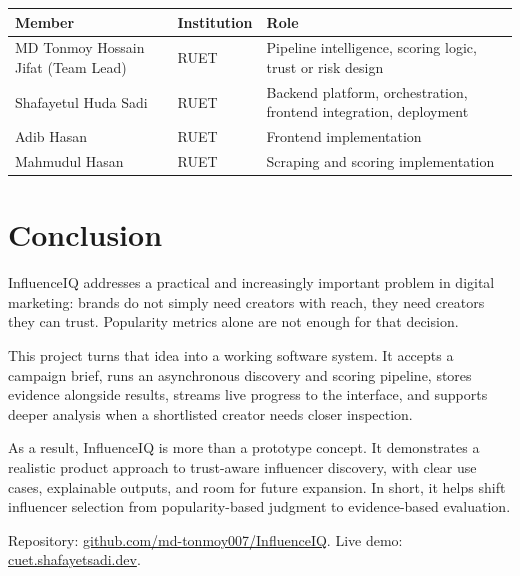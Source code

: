 \documentclass[11pt,a4paper]{article}
\begin{document}
\begin{center}
\begin{tabular}{p{} p{} p{}}
\toprule
\textbf{Member} & \textbf{Institution} & \textbf{Role} \\
\midrule
MD Tonmoy Hossain Jifat (Team Lead) & RUET & Pipeline intelligence, scoring logic, trust or risk design \\
Shafayetul Huda Sadi & RUET & Backend platform, orchestration, frontend integration, deployment \\
Adib Hasan & RUET & Frontend implementation \\
Mahmudul Hasan & RUET & Scraping and scoring implementation \\
\bottomrule
\end{tabular}
\end{center}

\section{Conclusion}

InfluenceIQ addresses a practical and increasingly important problem in digital marketing: brands do not simply need creators with reach, they need creators they can trust. Popularity metrics alone are not enough for that decision.

This project turns that idea into a working software system. It accepts a campaign brief, runs an asynchronous discovery and scoring pipeline, stores evidence alongside results, streams live progress to the interface, and supports deeper analysis when a shortlisted creator needs closer inspection.

As a result, InfluenceIQ is more than a prototype concept. It demonstrates a realistic product approach to trust-aware influencer discovery, with clear use cases, explainable outputs, and room for future expansion. In short, it helps shift influencer selection from popularity-based judgment to evidence-based evaluation.

\smallskip
{\footnotesize
Repository: \href{https://github.com/md-tonmoy007/InfluenceIQ}{github.com/md-tonmoy007/InfluenceIQ}. \quad
Live demo: \href{https://cuet.shafayetsadi.dev/}{cuet.shafayetsadi.dev}.
}
\end{document}
